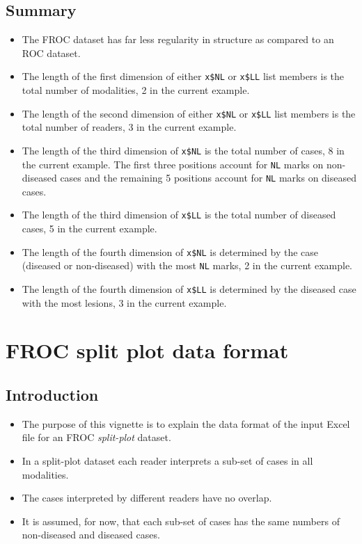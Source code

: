 \documentclass[]{book}
\providecommand{\tightlist}{%
  \setlength{\itemsep}{0pt}\setlength{\parskip}{0pt}}
\begin{document}
\hypertarget{summary-1}{%
\section{Summary}\label{summary-1}}

\begin{itemize}
\tightlist
\item
  The FROC dataset has far less regularity in structure as compared to an ROC dataset.
\item
  The length of the first dimension of either \texttt{x\$NL} or \texttt{x\$LL} list members is the total number of modalities, 2 in the current example.
\item
  The length of the second dimension of either \texttt{x\$NL} or \texttt{x\$LL} list members is the total number of readers, 3 in the current example.
\item
  The length of the third dimension of \texttt{x\$NL} is the total number of cases, 8 in the current example. The first three positions account for \texttt{NL} marks on non-diseased cases and the remaining 5 positions account for \texttt{NL} marks on diseased cases.
\item
  The length of the third dimension of \texttt{x\$LL} is the total number of diseased cases, 5 in the current example.
\item
  The length of the fourth dimension of \texttt{x\$NL} is determined by the case (diseased or non-diseased) with the most \texttt{NL} marks, 2 in the current example.
\item
  The length of the fourth dimension of \texttt{x\$LL} is determined by the diseased case with the most lesions, 3 in the current example.
\end{itemize}

\hypertarget{frocSpdataformat}{%
\chapter{FROC split plot data format}\label{frocSpdataformat}}

\hypertarget{introduction-3}{%
\section{Introduction}\label{introduction-3}}

\begin{itemize}
\tightlist
\item
  The purpose of this vignette is to explain the data format of the input Excel file for an FROC \emph{split-plot} dataset.
\item
  In a split-plot dataset each reader interprets a sub-set of cases in all modalities.
\item
  The cases interpreted by different readers have no overlap.
\item
  It is assumed, for now, that each sub-set of cases has the same numbers of non-diseased and diseased cases.
\end{itemize}
\end{document}
